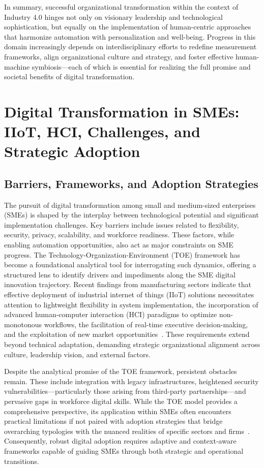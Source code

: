 In summary, successful organizational transformation within the context of Industry 4.0 hinges not only on visionary leadership and technological sophistication, but equally on the implementation of human-centric approaches that harmonize automation with personalization and well-being. Progress in this domain increasingly depends on interdisciplinary efforts to redefine measurement frameworks, align organizational culture and strategy, and foster effective human-machine symbiosis—each of which is essential for realizing the full promise and societal benefits of digital transformation.

\section{Digital Transformation in SMEs: IIoT, HCI, Challenges, and Strategic Adoption}

\subsection{Barriers, Frameworks, and Adoption Strategies}

The pursuit of digital transformation among small and medium-sized enterprises (SMEs) is shaped by the interplay between technological potential and significant implementation challenges. Key barriers include issues related to flexibility, security, privacy, scalability, and workforce readiness. These factors, while enabling automation opportunities, also act as major constraints on SME progress. The Technology-Organization-Environment (TOE) framework has become a foundational analytical tool for interrogating such dynamics, offering a structured lens to identify drivers and impediments along the SME digital innovation trajectory. Recent findings from manufacturing sectors indicate that effective deployment of industrial internet of things (IIoT) solutions necessitates attention to lightweight flexibility in system implementation, the incorporation of advanced human-computer interaction (HCI) paradigms to optimize non-monotonous workflows, the facilitation of real-time executive decision-making, and the exploitation of new market opportunities~\cite{ref89}. These requirements extend beyond technical adaptation, demanding strategic organizational alignment across culture, leadership vision, and external factors.

Despite the analytical promise of the TOE framework, persistent obstacles remain. These include integration with legacy infrastructures, heightened security vulnerabilities—particularly those arising from third-party partnerships—and pervasive gaps in workforce digital skills. While the TOE model provides a comprehensive perspective, its application within SMEs often encounters practical limitations if not paired with adoption strategies that bridge overarching typologies with the nuanced realities of specific sectors and firms~\cite{ref89}. Consequently, robust digital adoption requires adaptive and context-aware frameworks capable of guiding SMEs through both strategic and operational transitions.

